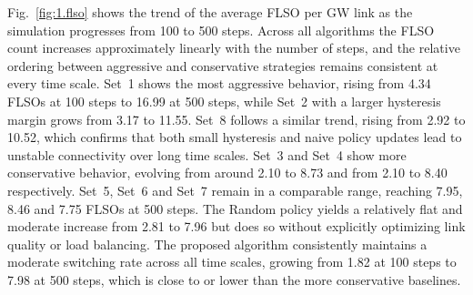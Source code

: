 Fig.~\ref{fig:1.flso} shows the trend of the average FLSO per GW link as the simulation progresses from 100 to 500 steps. Across all algorithms the FLSO count increases approximately linearly with the number of steps, and the relative ordering between aggressive and conservative strategies remains consistent at every time scale. Set~1 shows the most aggressive behavior, rising from 4.34 FLSOs at 100 steps to 16.99 at 500 steps, while Set~2 with a larger hysteresis margin grows from 3.17 to 11.55. Set~8 follows a similar trend, rising from 2.92 to 10.52, which confirms that both small hysteresis and naive policy updates lead to unstable connectivity over long time scales. Set~3 and Set~4 show more conservative behavior, evolving from around 2.10 to 8.73 and from 2.10 to 8.40 respectively. Set~5, Set~6 and Set~7 remain in a comparable range, reaching 7.95, 8.46 and 7.75 FLSOs at 500 steps. The Random policy yields a relatively flat and moderate increase from 2.81 to 7.96 but does so without explicitly optimizing link quality or load balancing. The proposed algorithm consistently maintains a moderate switching rate across all time scales, growing from 1.82 at 100 steps to 7.98 at 500 steps, which is close to or lower than the more conservative baselines.

